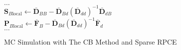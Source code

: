 \begin{center}
\begin{algorithm}[H]
{{            \vspace{1.0em}%
            $\dots$ \\
            \vspace{1.0em}%
            $
                \mathbf{S}_{B\text{local}} \longleftarrow
                \overline{\mathbf{D}}_{BB}
                -
                \overline{\mathbf{D}}_{Bd}
                \left(
                    \overline{\mathbf{D}}_{dd}
                \right)^{-1}
                \overline{\mathbf{D}}_{dB}
            $ \\
            $
                \mathbf{P}_{B\text{local}} \longleftarrow
                \overline{\mathbf{F}}_{B}
                -
                \overline{\mathbf{D}}_{Bd}
                \left(
                    \overline{\mathbf{D}}_{dd}
                \right)^{-1}
                \overline{\mathbf{F}}_{d}
            $ \\
            \vspace{1.0em}%
            $\dots$ \\
            \vspace{1.0em}%
        }
    }
  \caption{MC Simulation with The CB Method and Sparse RPCE}
\end{algorithm}
\end{center}

